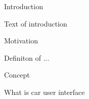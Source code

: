 \chap Introduction

Text of introduction

\sec Motivation

\secc Definiton of ...

\sec Concept

\secc What is car user interface

